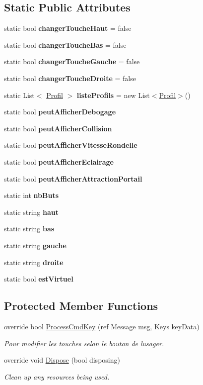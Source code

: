 \subsection*{Static Public Attributes}
\begin{DoxyCompactItemize}
\item 
static bool {\bfseries changer\+Touche\+Haut} = false
\item 
static bool {\bfseries changer\+Touche\+Bas} = false
\item 
static bool {\bfseries changer\+Touche\+Gauche} = false
\item 
static bool {\bfseries changer\+Touche\+Droite} = false
\item 
static List$<$ \hyperlink{struct_interface_graphique_1_1_profil}{Profil} $>$ {\bfseries liste\+Profils} = new List$<$\hyperlink{struct_interface_graphique_1_1_profil}{Profil}$>$()
\item 
static bool {\bfseries peut\+Afficher\+Debogage}
\item 
static bool {\bfseries peut\+Afficher\+Collision}
\item 
static bool {\bfseries peut\+Afficher\+Vitesse\+Rondelle}
\item 
static bool {\bfseries peut\+Afficher\+Eclairage}
\item 
static bool {\bfseries peut\+Afficher\+Attraction\+Portail}
\item 
static int {\bfseries nb\+Buts}
\item 
static string {\bfseries haut}
\item 
static string {\bfseries bas}
\item 
static string {\bfseries gauche}
\item 
static string {\bfseries droite}
\item 
static bool {\bfseries est\+Virtuel}
\end{DoxyCompactItemize}
\subsection*{Protected Member Functions}
\begin{DoxyCompactItemize}
\item 
override bool \hyperlink{group__inf2990_ga1acc9513c830f0ef53c3fb0ded70bf44}{Process\+Cmd\+Key} (ref Message msg, Keys key\+Data)
\begin{DoxyCompactList}\small\item\em Pour modifier les touches selon le bouton de l\textquotesingle{}usager. \end{DoxyCompactList}\item 
override void \hyperlink{class_interface_graphique_1_1_configuration_a0200b084946b5710be7d94f9e8b0385c}{Dispose} (bool disposing)
\begin{DoxyCompactList}\small\item\em Clean up any resources being used. \end{DoxyCompactList}\end{DoxyCompactItemize}


